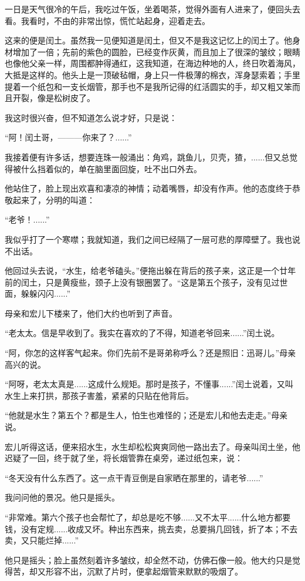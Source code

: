 \documentclass[12pt,UTF8]{ctexbook}
\begin{document}
一日是天气很冷的午后，我吃过午饭，坐着喝茶，觉得外面有人进来了，便回头去看。我看时，不由的非常出惊，慌忙站起身，迎着走去。

这来的便是闰土。虽然我一见便知道是闰土，但又不是我这记忆上的闰土了。他身材增加了一倍；先前的紫色的圆脸，已经变作灰黄，而且加上了很深的皱纹；眼睛也像他父亲一样，周围都肿得通红，这我知道，在海边种地的人，终日吹着海风，大抵是这样的。他头上是一顶破毡帽，身上只一件极薄的棉衣，浑身瑟索着；手里提着一个纸包和一支长烟管，那手也不是我所记得的红活圆实的手，却又粗又笨而且开裂，像是松树皮了。

我这时很兴奋，但不知道怎么说才好，只是说：

“阿！闰土哥，———你来了？......”

我接着便有许多话，想要连珠一般涌出：角鸡，跳鱼儿，贝壳，猹，......但又总觉得被什么挡着似的，单在脑里面回旋，吐不出口外去。

他站住了，脸上现出欢喜和凄凉的神情；动着嘴唇，却没有作声。他的态度终于恭敬起来了，分明的叫道：

“老爷！......”

我似乎打了一个寒噤；我就知道，我们之间已经隔了一层可悲的厚障壁了。我也说不出话。

他回过头去说，“水生，给老爷磕头。”便拖出躲在背后的孩子来，这正是一个廿年前的闰土，只是黄瘦些，颈子上没有银圈罢了。“这是第五个孩子，没有见过世面，躲躲闪闪......”

母亲和宏儿下楼来了，他们大约也听到了声音。

“老太太。信是早收到了。我实在喜欢的了不得，知道老爷回来......”闰土说。

“阿，你怎的这样客气起来。你们先前不是哥弟称呼么？还是照旧：迅哥儿。”母亲高兴的说。

“阿呀，老太太真是......这成什么规矩。那时是孩子，不懂事......”闰土说着，又叫水生上来打拱，那孩子害羞，紧紧的只贴在他背后。

“他就是水生？第五个？都是生人，怕生也难怪的；还是宏儿和他去走走。”母亲说。

宏儿听得这话，便来招水生，水生却松松爽爽同他一路出去了。母亲叫闰土坐，他迟疑了一回，终于就了坐，将长烟管靠在桌旁，递过纸包来，说：

“冬天没有什么东西了。这一点干青豆倒是自家晒在那里的，请老爷......”

我问问他的景况。他只是摇头。

“非常难。第六个孩子也会帮忙了，却总是吃不够......又不太平......什么地方都要钱，没有定规......收成又坏。种出东西来，挑去卖，总要捐几回钱，折了本；不去卖，又只能烂掉......”

他只是摇头；脸上虽然刻着许多皱纹，却全然不动，仿佛石像一般。他大约只是觉得苦，却又形容不出，沉默了片时，便拿起烟管来默默的吸烟了。
\end{document}
